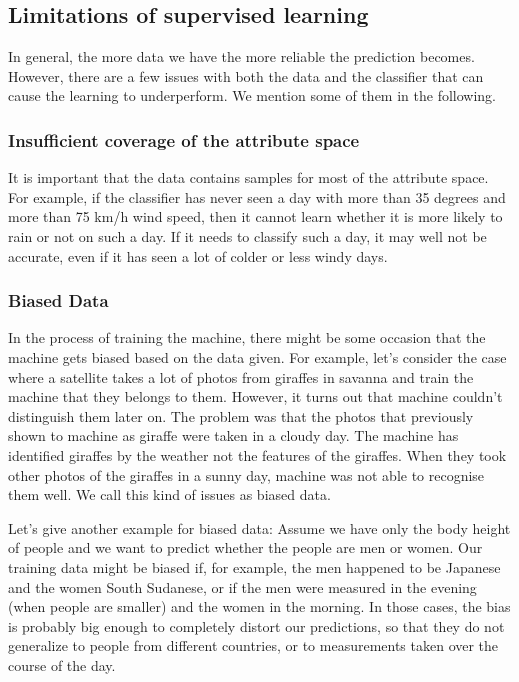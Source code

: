 \documentclass[10pt,a4paper]{article}
\begin{document}
\subsection{Limitations of supervised learning}
In general, the more data we have the more reliable the prediction becomes. However, there are a few issues with both the data and the classifier that can cause the learning to underperform. We mention some of them in the following.
\subsubsection{Insufficient coverage of the attribute space} \label{insuf}
It is important that the data contains samples for most of the attribute space. For example, if the classifier has never seen a day with more than 35 degrees and more than 75 km/h wind speed, then it cannot learn whether it is more likely to rain or not on such a day. If it needs to classify such a day, it may well not be accurate, even if it has seen a lot of colder or less windy days. %
\subsubsection{Biased Data}\label{biased}
In the process of training the machine, there might be some occasion that the machine gets biased based on the data given. For example, let's consider the case where a satellite takes a lot of photos from giraffes in savanna and train the machine that they belongs to them. However, it turns out that machine couldn't distinguish them later on. The problem was that the photos that previously shown to machine as giraffe were taken in a cloudy day. The machine has identified giraffes by the weather not the features of the giraffes. When they took other photos of the giraffes in a sunny day, machine was not able to recognise them well. We call this kind of issues as biased data.

Let's give another example for biased data: Assume we have only the body height of people and we want to predict whether the people are men or women. Our training data might be biased if, for example, the men happened to be Japanese and the women South Sudanese, or if the men were measured in the evening (when people are smaller) and the women in the morning. In those cases, the bias is probably big enough to completely distort our predictions, so that they do not generalize to people from different countries, or to measurements taken over the course of the day.
\end{document}
